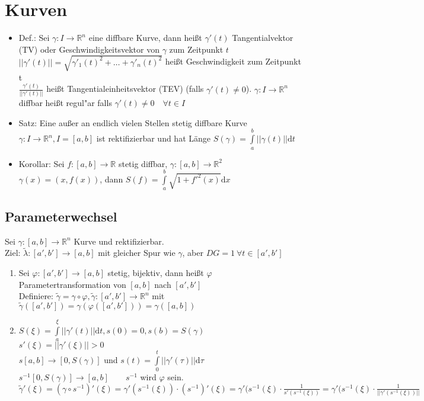 \documentclass[10pt,a4paper^, twocolumn]{article}
\newcommand{\menge}{\mathbb} %
\renewcommand{\phi}{\varphi} %
\renewcommand{\d}{\mathrm{d}} %
\begin{document}
\section{Kurven}
	\begin{itemize}
	\item{Def.:} Sei $\gamma : I \rightarrow \menge{R}^n$ eine diffbare Kurve, 
		dann heißt $\gamma'(t)$ Tangentialvektor (TV) oder Geschwindigkeitsvektor von $\gamma$ zum Zeitpunkt $t$ \\
		$||\gamma'(t)|| = \sqrt{\gamma'_1(t)^2 + \dots + \gamma'_n(t)^2}$ heißt Geschwindigkeit zum Zeitpunkt t \\
		$\frac{\gamma'(t)}{||\gamma'(t)||}$ heißt Tangentialeinheitsvektor (TEV) (falls $\gamma'(t) \neq 0$).
		$\gamma: I \rightarrow \menge{R}^n$ diffbar heißt regul"ar falls $\gamma'(t) \neq 0 \quad \forall t \in I$
	\item{Satz:} Eine außer an endlich vielen Stellen stetig diffbare Kurve $\gamma: I \rightarrow \menge{R}^n, I=[a,b]$ ist rektifizierbar und hat Länge
		$S(\gamma) = \int\limits_a^b || \gamma(t) || \d t$
	\item{Korollar:} Sei $f:[a,b] \rightarrow \menge{R}$ stetig diffbar, $\gamma:[a,b] \rightarrow \menge{R}^2$ \\
		$\gamma(x) = (x, f(x))$, 
		dann $S(f) = \int\limits_a^b\sqrt{1+f'^2(x)} \d x $
	\end{itemize}


\subsection{Parameterwechsel}
	Sei $\gamma : [a,b] \rightarrow \menge{R}^n$ Kurve und rektifizierbar. \\
	Ziel: $\tilde\lambda : [a', b'] \rightarrow [a,b]$ mit gleicher Spur wie $\gamma$, aber $DG = 1 \ \forall t \in [a', b']$ \\
	\begin{enumerate}
	\item{}  Sei $\phi:[a', b'] \rightarrow [a,b]$ stetig, bijektiv, dann heißt $\phi$ Parametertransformation von $[a,b]$ nach $[a',b']$ \\
	Definiere: $\tilde\gamma = \gamma \circ \phi, \tilde\gamma:[a', b'] \rightarrow \menge{R}^n$ mit $\tilde\gamma([a',b']) = \gamma(\phi([a',b'])) = \gamma([a,b])$ \\
	\item{} $S(\xi) = \int\limits_a^\xi ||\gamma'(t)|| \d t, s(0) = 0, s(b) = S(\gamma)$ \\
	$s'(\xi) = ||\gamma'(\xi)|| > 0$ \\
	$s [a,b] \rightarrow [0, S(\gamma)]$ und $s(t) = \int\limits_0^t ||\gamma'(\tau)|| \d \tau $ \\
	$s^{-1}[0,S(\gamma)] \rightarrow [a,b] \qquad s^{-1}$ wird $\phi$ sein. \\
	$\tilde\gamma'(\xi) = (\gamma \circ s^{-1})'(\xi) = \gamma'(s^{-1}(\xi)) \cdot (s^{-1})'(\xi) = 
	\gamma'(s^{-1}(\xi)\cdot \frac{1}{s'(s^{-1}(\xi))} = \gamma'(s^{-1}(\xi) \cdot \frac{1}{||\gamma'(s^{-1}(\xi))||}$
	\end{enumerate}
\end{document}
